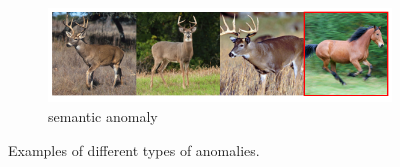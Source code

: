 \begin{figure}
     \vspace{0.1in}

     \begin{subfigure}[b]{0.8\textwidth}
         \centering
         \includegraphics[width=\textwidth]{data/chapter_intro/semantic_anomalies.png}
         \caption{semantic anomaly}
         \label{fig:semantic_anomaly}
     \end{subfigure}

\caption{Examples of different types of anomalies.}
\label{fig:anomaly_examples}
\end{figure}

